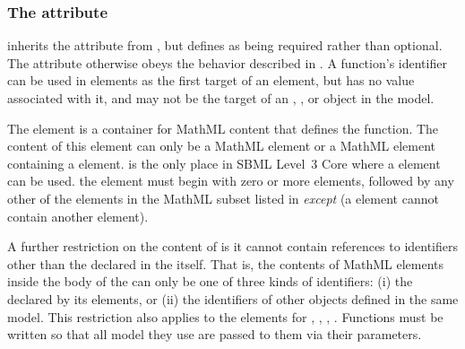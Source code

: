 \subsubsection{The  attribute}

\begin{blockChanged}
\FunctionDefinition inherits the  attribute from \SBase, but defines  as being required rather than optional.  The  attribute otherwise obeys the behavior described in .  A function's identifier can be used in  elements as the first target of an  element, but has no value associated with it, and may not be the target of an \InitialAssignment, \EventAssignment, or \Rule object in the model.
\end{blockChanged}


\label{sec:function-definition-math}

The   element is a container for MathML content that
defines the function.  The content of this element can only be a
MathML  element or a MathML 
element containing a  element.  \FunctionDefinition
is the only place in SBML Level~3 Core where a 
element can be used.   the  element must begin with
zero or more  elements, followed by any other of the
elements in the MathML subset listed in
 \emph{except}  (\ie a
 element cannot contain another 
element).

A further restriction on the content of  is it cannot
contain references to identifiers other than the
 declared in the  itself.  That
is, the contents of MathML  elements inside the body of
the  can only be one of three kinds of
  identifiers: (i) the  declared by its 
  elements, or (ii) the identifiers of other
\FunctionDefinition objects defined in the same model.
This
restriction also applies to the  elements for
, , , .
Functions must be written so that all model  they use are
passed to them via their parameters.



